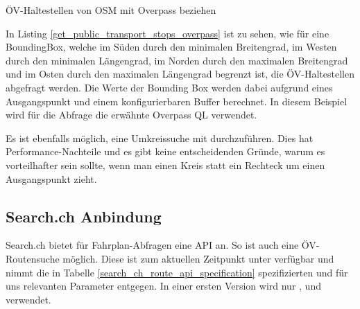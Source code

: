 \begin{listing}[ht]
    \inputminted{python}{projectdoc/listing/get_public_transport_stops_overpass.py}
    \caption{ÖV-Haltestellen von \acs{OSM} mit Overpass beziehen}
    \label{get_public_transport_stops_overpass}
\end{listing}

In Listing \ref{get_public_transport_stops_overpass} ist zu sehen, wie für eine \gls{BoundingBox}, welche im Süden durch den minimalen Breitengrad, im Westen durch den minimalen Längengrad, im Norden durch den maximalen Breitengrad und im Osten durch den maximalen Längengrad begrenzt ist, die ÖV-Haltestellen abgefragt werden. Die Werte der Bounding Box werden dabei aufgrund eines Ausgangspunkt und einem konfigurierbaren Buffer berechnet. In diesem Beispiel wird für die Abfrage die erwähnte Overpass QL verwendet.

Es ist ebenfalls möglich, eine Umkreissuche mit  durchzuführen. Dies hat Performance-Nachteile und es gibt keine entscheidenden Gründe, warum es vorteilhafter sein sollte, wenn man einen Kreis statt ein Rechteck um einen Ausgangspunkt zieht.

\subsection{Search.ch Anbindung}
\label{analyse:Search.ch Anbindung}
Search.ch bietet für Fahrplan-Abfragen eine API \cite{search_ch_route_api} an. So ist  auch eine ÖV-Routensuche möglich. Diese ist zum aktuellen Zeitpunkt unter \cite{search_ch_route_api} verfügbar und nimmt die in Tabelle \ref{search_ch_route_api_specification} spezifizierten und für uns relevanten Parameter entgegen. In einer ersten Version wird nur ,  und  verwendet.

